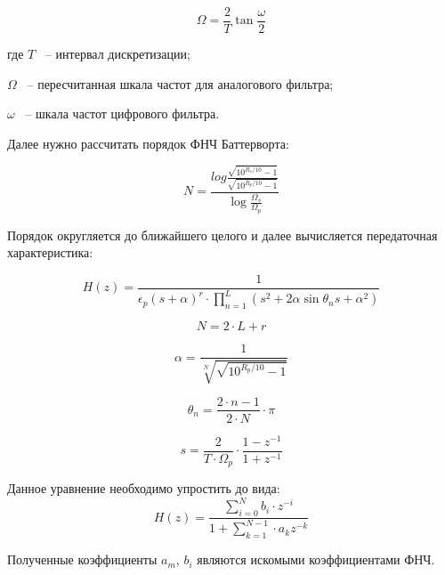 \begin{equation}
    \label{eq:domain:Omega}
    \Omega=\frac{2}{T}\tan{\frac{\omega}{2}}
    \end{equation}
    \begin{explanationx}
        \item[где] $T$ ~-- интервал дискретизации;
        \item      $\Omega$ ~-- пересчитанная шкала частот для аналогового фильтра;
        \item      $\omega$ ~-- шкала частот цифрового фильтра.
      \end{explanationx} 

Далее нужно рассчитать порядок ФНЧ Баттерворта:

\begin{equation}
    \label{eq:domain:NIIC}
    N=\frac{log{\frac{\sqrt{10^{R_{s}/10}-1}}
                     {\sqrt{10^{R_{p}/10}-1}}}}
           {\log{\frac{\Omega_{s}}
                      {\Omega_{p}}}}
    \end{equation}

Порядок округляется до ближайшего целого и далее вычисляется передаточная характеристика:

\begin{equation}
    \label{eq:domain:Hz}
    H(z) = \frac{1}
                {\epsilon_{p} (s + \alpha )^r \cdot \prod_{n=1}^{L} (s^{2} + 2 \alpha \sin{ \theta_{n} s + \alpha^{2}})}
    \end{equation}

\begin{equation}
        \label{eq:domain:whereN}
        N=2 \cdot L+r
        \end{equation}

\begin{equation}
        \label{eq:domain:whereAlpha}
        \alpha=\frac{1}
                    {\sqrt[N]{\sqrt{10^{R_{p}/10}-1}}}
        \end{equation}

\begin{equation}
        \label{eq:domain:whereTheta}
        \theta_{n}=\frac{2\cdot n - 1}
                        {2\cdot N} \cdot \pi
        \end{equation}

\begin{equation}
        \label{eq:domain:whereS}
        s=\frac{2}
                {T\cdot \Omega_{p}} \cdot \frac{1-z^{-1}}
                                                {1+z^{-1}}
        \end{equation}

Данное уравнение необходимо упростить до вида:
\begin{equation}
    \label{eq:domain:whereS}
    H(z)=\frac{\sum_{i=0}^{N}b_{i}\cdot z^{-i}}{1+\sum_{k=1}^{N-1}\cdot a_{k}z^{-k}}
    \end{equation}

Полученные коэффициенты $a_{m}$, $b_{i}$ являются искомыми коэффициентами ФНЧ. %
